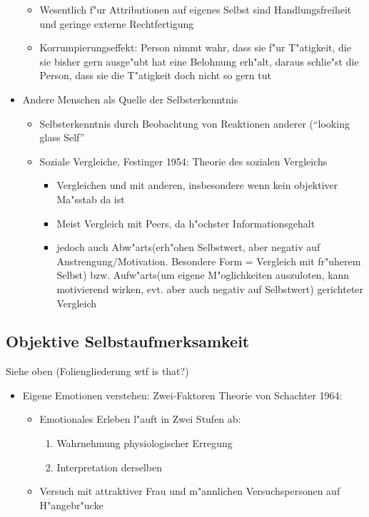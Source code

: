 \begin{itemize}
		\begin{itemize}
			\item
				Wesentlich f"ur Attributionen auf eigenes Selbst sind Handlungsfreiheit und geringe externe Rechtfertigung
			\item
				Korrumpierungseffekt: Person nimmt wahr, dass sie f"ur T"atigkeit, die sie bisher gern ausge"ubt hat eine Belohnung erh"alt, daraus schlie"st die Person, dass sie die T"atigkeit doch nicht so gern tut
		\end{itemize}
	\item
		Andere Menschen als Quelle der Selbsterkenntnis
		\begin{itemize}
			\item
				Selbsterkenntnis durch Beobachtung von Reaktionen anderer (\enquote{looking glass Self}
			\item
				Soziale Vergleiche, Festinger 1954: Theorie des sozialen Vergleichs
				\begin{itemize}
					\item
						Vergleichen und mit anderen, insbesondere wenn kein objektiver Ma"sstab da ist
					\item
						Meist Vergleich mit Peers, da h"ochster Informationsgehalt
					\item
						jedoch auch Abw"arts(erh"ohen Selbstwert, aber negativ auf Anstrengung/Motivation. Besondere Form = Vergleich mit fr"uherem Selbst) bzw. Aufw"arts(um eigene M"oglichkeiten auszuloten, kann motivierend wirken, evt. aber auch negativ auf Selbstwert) gerichteter Vergleich
				\end{itemize}
		\end{itemize}
\end{itemize}

\subsection{Objektive Selbstaufmerksamkeit}
Siehe oben (Foliengliederung wtf is that?)
\begin{itemize}
	\item
		Eigene Emotionen verstehen: Zwei-Faktoren Theorie von Schachter 1964:
		\begin{itemize}
			\item
				Emotionales Erleben l"auft in Zwei Stufen ab:
				\begin{enumerate}
					\item
						Wahrnehmung physiologischer Erregung
					\item
						Interpretation derselben
			\end{enumerate}
		\item
			Versuch mit attraktiver Frau und m"annlichen Versuchspersonen auf H"angebr"ucke
		\end{itemize}
\end{itemize}

